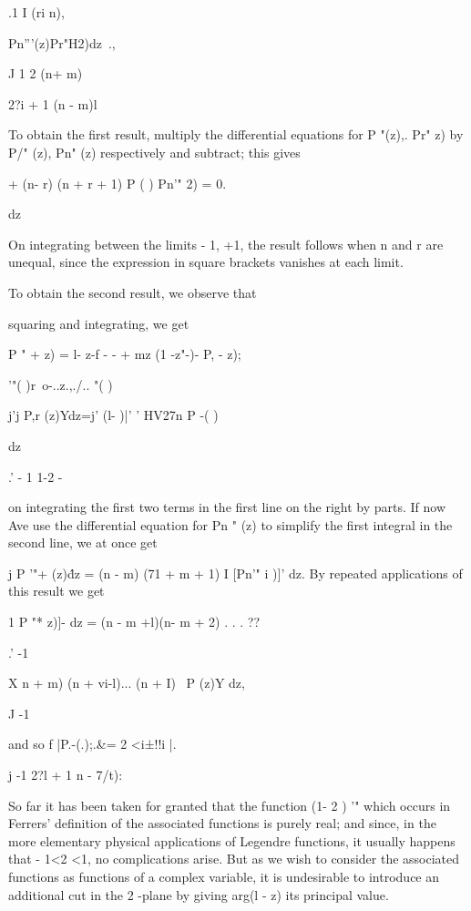 {{{.1 I (ri n),

Pn'''(z)Pr"H2)dz\, .,

J 1 2 (n+ m)\

2?i + 1 (n - m)l

To obtain the first result, multiply the differential equations for P
"(z),. Pr" z) by P/" (z), Pn" (z) respectively and subtract; this
gives

+ (n- r) (n + r + 1) P ( ) Pn'" 2) = 0.

dz

%
%

On integrating between the limits - 1, +1, the result follows when n
and r are unequal, since the expression in square brackets vanishes at
each limit.

To obtain the second result, we observe that

squaring and integrating, we get

P " + z) = l- z-f - - + mz (1 -z"-)- P, - z);

  '"( )r\ o-..z.,./.. "( )

j'j P,r (z)Ydz=j' (l- )|' ' HV27n P -( )

dz

.' - 1 1-2 -

on integrating the first two terms in the first line on the right by
parts. If now Ave use the differential equation for Pn " (z) to
simplify the first integral in the second line, we at once get

j P '"+ (z)\' dz = (n - m) (71 + m + 1) I [Pn'" i )]' dz. By repeated
applications of this result we get

1 P "* z)]- dz = (n - m +l)(n- m + 2) . . . ??

.' -1

X n + m) (n + vi-l)... (n + I) \ P (z)Y dz,

J -1

and so f |P.-(.);.\&= 2 <i±!!i |.

j -1 2?l + 1 n - 7/t):


So far it has been taken for granted that the function (1- 2 ) '"
which occurs in Ferrers' definition of the associated functions is
purely real; and since, in the more elementary physical applications
of Legendre functions, it usually happens that - 1<2 <1, no
complications arise. But as we wish to consider the associated
functions as functions of a complex variable, it is undesirable to
introduce an additional cut in the 2 -plane by giving arg(l - z) its
principal value.

}}}
